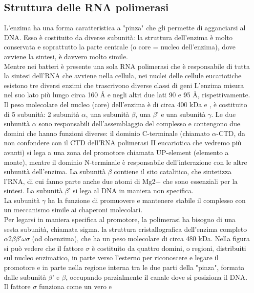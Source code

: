 \documentclass{article}
\begin{document}
\subsection{Struttura delle RNA polimerasi}
L'enzima ha una forma caratteristica a "pinza" che gli permette di agganciarsi al DNA. Esso è costituito da diverse subunità: la struttura dell'enzima è molto conservata e soprattutto la parte centrale (o
core = nucleo dell'enzima), dove avviene la sintesi, è davvero molto simile.\\
Mentre nei batteri è presente una sola RNA polimerasi che è responsabile di
tutta la sintesi dell'RNA che avviene nella cellula, nei nuclei delle cellule eucariotiche esistono tre diversi enzimi che trascrivono diverse classi di geni
L'enzima misura nel suo lato più lungo circa 160 Å e negli altri due lati
90 e 95 Å, rispettivamente. Il peso molecolare del nucleo (core) dell'enzima è di
circa 400 kDa e , è costituito di 5 subunità:
2 subunità $\alpha$, una subunità $\beta$, una $\beta$' e una subunità $\gamma$. Le due subunità $\alpha$ sono
responsabili dell'assemblaggio del complesso e contengono due domini che hanno
funzioni diverse: il dominio C-terminale (chiamato $\alpha$-CTD, da non confondere
con il CTD dell'RNA polimerasi II eucariotica che vedremo più avanti) si lega a
una zona del promotore chiamata UP-element (elemento a monte), mentre il dominio N-terminale è responsabile dell'interazione con le altre subunità dell'enzima.
La subunità $\beta$ contiene il sito catalitico, che sintetizza l'RNA, di cui fanno parte
anche due atomi di Mg2+ che sono essenziali per la sintesi. La subunità $\beta$' si lega al DNA in maniera non specifica.\\
La subunità $\gamma$ ha la funzione di promuovere e mantenere stabile il complesso con un
meccanismo simile ai chaperoni molecolari.\\
Per legarsi in maniera specifica al promotore, la polimerasi ha bisogno di una
sesta subunità, chiamata sigma.  la struttura cristallografica
dell'enzima completo $\alpha 2\beta\beta'\omega \sigma$ (od oloenzima), che ha un peso molecolare di
circa 480 kDa. Nella figura si può vedere che il fattore $\sigma$ è costituito da quattro
domini, o regioni, distribuiti sul nucleo enzimatico, in parte verso l'esterno per
riconoscere e legare il promotore e in parte nella regione interna tra le due parti
della "pinza", formata dalle subunità $\beta$' e $\beta$, occupando parzialmente il canale
dove si posiziona il DNA.\\
Il fattore $\sigma$ funziona come un vero e
\end{document}
